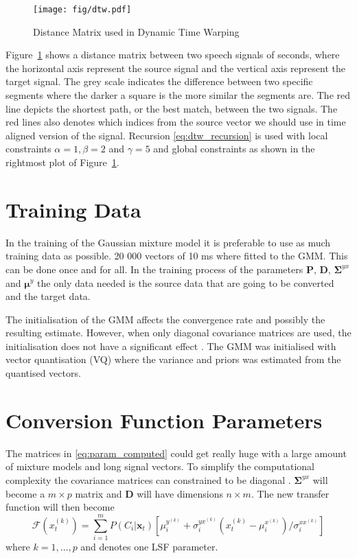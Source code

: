 \begin{figure}[htbp]
	\begin{center}
		\texttt{[image: fig/dtw.pdf]}
		\caption{Distance Matrix used in Dynamic Time Warping}
		\label{fig:dtw}
	\end{center}
\end{figure}
Figure~\ref{fig:dtw} shows a distance matrix between two speech signals of  seconds, where the horizontal axis represent the source signal and the vertical axis represent the target signal. The grey scale indicates the difference between two specific segments where the darker a square is the more similar the segments are. The red line depicts the shortest path, or the best match, between the two signals. The red lines also denotes which indices from the source vector we should use in time aligned version of the signal. Recursion \eqref{eq:dtw_recursion} is used with local constraints $\alpha=1, \beta=2$ and $\gamma=5$ and global constraints as shown in the rightmost plot of Figure~\ref{fig:dtw}.

\section{Training Data} %
\label{sec:training_data}
In the training of the Gaussian mixture model it is preferable to use as much training data as possible. 20 000 vectors of 10 ms where fitted to the GMM. This can be done once and for all. In the training process of the parameters $\mathbf{P}$, $\mathbf{D}$, $\mathbf{\Sigma}^{yx}$ and $\boldsymbol{\mu}^y$ the only data needed is the source data that are going to be converted and the target data.

The initialisation of the GMM affects the convergence rate and possibly the resulting estimate. However, when only diagonal covariance matrices are used, the initialisation does not have a significant effect \cite{reynolds93}. The GMM was initialised with vector quantisation (VQ) where the variance and priors was estimated from the quantised vectors.

\section{Conversion Function Parameters} %
\label{sec:conversion_function_parameters}
The matrices in \eqref{eq:param_computed} could get really huge with a large amount of mixture models and long signal vectors. To simplify the computational complexity the covariance matrices can constrained to be diagonal \cite{stylianou98}. $\mathbf{\Sigma}^{yx}$ will become a $m\times p$ matrix and $\mathbf{D}$ will have dimensions $n\times m$. The new transfer function will then become
\begin{equation}
	\mathcal{F}(x_t^{(k)}) = \sum_{i=1}^{m}P(C_i \vert \mathbf{x}_t)[\mu_i^{y^{(k)}}+\sigma_i^{yx^{(k)}}  (x_t^{(k)}-\mu_i^{x^{(k)}})/\sigma_i^{xx^{(k)}}]
\end{equation}
where $k=1,\dots,p$ and denotes one LSF parameter.

